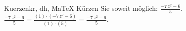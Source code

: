\begin{MAufgabe}{Kuerzen}{kr, dh, MaTeX}
K\"urzen Sie soweit m\"oglich: $\frac{ - 7\, z^2 - 6}{5}$.\\ 
\ifLsg\MLoesung
\quad $\frac{ - 7\, z^2 - 6}{5}=\frac{(1)\cdot( - 7\, z^2 - 6)}{(1)\cdot(5)}=\frac{ - 7\, z^2 - 6}{5}$.\else\relax\fi
 \end{MAufgabe}